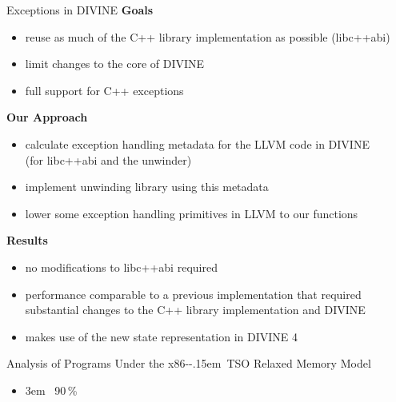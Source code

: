 \documentclass[aspectratio=169, fi]{paradise-slide}
\newcommand{\fcite}[1]{\emergencystretch 3em{\protect\NoHyper\cite{#1}}~\fullcite{#1}}
\newcommand{\xtso}{\mbox{x86-\kern-.15em TSO}\xspace}
\newenvironment{prespart}[1]{%
  \begin{frame}{}%
    \centering
      {\Large #1} \par\bigskip\bigskip%
}{%
  \end{frame}%
}
\begin{document}
\begin{frame}{Exceptions in DIVINE}
  \textbf{Goals}
  \begin{itemize}
    \item reuse as much of the C++ library implementation as possible (libc++abi)
    \item limit changes to the core of DIVINE
    \item full support for C++ exceptions
  \end{itemize}
  \pause

  \bigskip
  \textbf{Our Approach}
  \begin{itemize}
    \item calculate exception handling metadata for the LLVM code in DIVINE\\
      (for libc++abi and the unwinder)
    \item implement unwinding library using this metadata
    \item lower some exception handling primitives in LLVM to our functions
  \end{itemize}
  \pause

  \bigskip
  \textbf{Results}
  \begin{itemize}
    \item no modifications to libc++abi required
    \item performance comparable to a previous implementation that required substantial changes to
      the C++ library implementation and DIVINE
    \item makes use of the new state representation in DIVINE 4
  \end{itemize}
\end{frame}

\begin{prespart}{Analysis of Programs Under the \xtso Relaxed Memory Model}
  \begin{itemize}
    \item \fcite{SB2018x86tso} \hfill 90\,\%
  \end{itemize}
\end{prespart}
\end{document}
